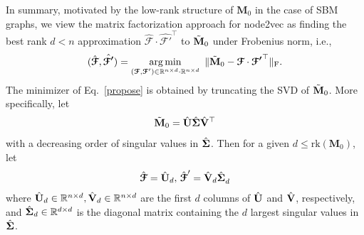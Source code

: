 \documentclass[10pt,journal,compsoc]{IEEEtran}
\newcommand{\ee}{\end{aligned} \end{equation}}
\newcommand{\bds}{\boldsymbol}
\newcommand{\T}{\top}
\newcommand{\tp}{^\top}
\DeclareMathOperator*{\argmin}{arg\,min}
\def\T{{ \mathrm{\scriptscriptstyle T} }} %
\newcommand{\bee}{\begin{equation}\begin{aligned}}
\newcommand{\M}[1]{{{\mathbf{\MakeUppercase{#1}}}}}
\newcommand{\F}{\mathrm{F}}
\numberwithin{equation}{section}
\begin{document}
In summary, motivated by the low-rank structure of  $\mathbf{M}_0$ in the case of SBM graphs, we view %
the matrix factorization approach for node2vec as
finding the best rank $d < n$ approximation $\hat{\bds{\mathcal{F}}}\cdot
\hat{\bds{\mathcal{F'}}}\tp$ to $\tilde{\M M}_0$ under Frobenius norm,
i.e.,  
\bee\label{propose}
(\hat{\bds{\mathcal{F}}},\hat{\bds{\mathcal{F}'}}) = \argmin_{({\bds{\mathcal{F}}},{\bds{\mathcal{F}}}')\in \mathbb{R}^{n\times d}\cdot\mathbb{R}^{n\times d}} \ \|\tilde{\M M}_0 - {\bds{\mathcal{F}}}\cdot {\bds{\mathcal{F}'}}\tp\|_{\F}.
\ee 
The minimizer of Eq.~\eqref{propose} is obtained by
truncating the SVD of $\tilde{\M M}_0$. More specifically, let
\bee\label{svdtrue}
\tilde{\M M}_0 = \hat{\M U} \hat{\M \Sigma} \hat{\M V}^{\top}
\ee 
with a decreasing order of singular values in $\hat{\M \Sigma}$. Then
for a given $d \leq \mathrm{rk}(\mathbf{M}_0)$, let 
\bee\label{def:f0}
\hat{\bds{\mathcal{F}}} = \hat{\M U}_d, \,\hat{\bds{\mathcal{F}}}' =
\hat{\M V}_d\hat{\M \Sigma}_d^{}
\ee
where $\hat{\M U}_d \in \mathbb{R}^{n\times d}, \hat{\M V}_d \in
\mathbb{R}^{n\times d}$ are the first $d$ columns of $ \hat{\M U}$ and
$\hat{\M V}$, respectively, and $\hat{\M \Sigma}_d \in
\mathbb{R}^{d\times d}$ is the diagonal matrix containing the $d$
largest singular values in $\hat{\M \Sigma}$.
\end{document}
